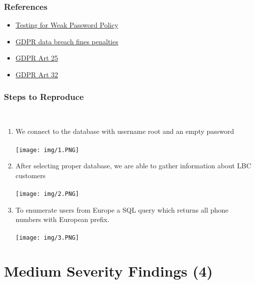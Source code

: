 \documentclass{article}
\begin{document}
\subsubsection*{References}
\begin{itemize}
	\item \href{https://owasp.org/www-project-web-security-testing-guide/latest/4-Web_Application_Security_Testing/04-Authentication_Testing/07-Testing_for_Weak_Password_Policy}{Testing for Weak Password Policy}
	              
	\item \href{https://www.vistainfosec.com/blog/everything-you-need-to-know-about-gdpr-data-breach-fines-penalties/}{GDPR data breach fines penalties}
	\item  \href{https://gdpr-info.eu/art-25-gdpr/ }{GDPR Art 25}
	\item  \href{https://gdpr-info.eu/art-32-gdpr/}{GDPR Art 32}
\end{itemize}
\newpage
\subsubsection*{Steps to Reproduce}\\
\begin{enumerate}
	\item 
	      We connect to the database with username root and an empty password
	      \\\\
	      \texttt{[image: img/1.PNG]}\\ \item 
	      After selecting proper database, we are able to gather information about LBC customers\\\\
	      \texttt{[image: img/2.PNG]}\\
	\item 
	      To enumerate users from Europe a SQL query which returns all phone numbers with European prefix.\\\\
	      \texttt{[image: img/3.PNG]}
\end{enumerate}
\newpage
\section{Medium Severity Findings (4)}
\\\\
\end{document}
